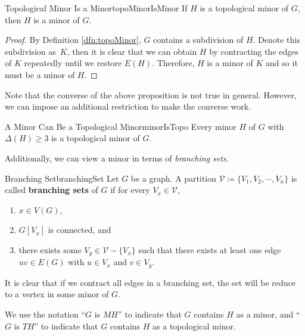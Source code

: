 \documentclass[math]{amznotes}
\theoremstyle{remark}
\newcommand{\0}{\mathbf{0}}
\newcommand{\1}{\mathbf{1}}
\begin{document}
\begin{probox}{Topological Minor Is a Minor}{topoMinorIsMinor}
    If $H$ is a topological minor of $G$, then $H$ is a minor of $G$.
    \tcblower
    \begin{proof}
        By Definition \ref{dfn:topoMinor}, $G$ contains a subdivision of $H$. Denote this subdivision as~$K$, then it is clear that we can obtain $H$ by contracting the edges of $K$ repeatedly until we restore $E(H)$. Therefore, $H$ is a minor of $K$ and so it must be a minor of $H$.
    \end{proof}
\end{probox}
Note that the converse of the above proposition is not true in general. However, we can impose an additional restriction to make the converse work.
\begin{probox}{A Minor Can Be a Topological Minor}{minorIsTopo}
    Every minor $H$ of $G$ with $\Delta(H) \geq 3$ is a topological minor of $G$.
\end{probox}
Additionally, we can view a minor in terms of \textit{branching sets}.
\begin{dfnbox}{Branching Set}{branchingSet}
    Let $G$ be a graph. A partition $\mathcal{V} \coloneqq \{V_1, V_2, \cdots, V_n\}$ is called {\color{red} \textbf{branching sets}} of $G$ if for every $V_x \in \mathcal{V}$,
    \begin{enumerate}
        \item $x \in V(G)$,
        \item $G[V_x]$ is connected, and
        \item there exists some $V_y \in \mathcal{V} - \{V_x\}$ such that there exists at least one edge $uv \in E(G)$ with $u \in V_x$ and $v \in V_y$.
    \end{enumerate}
\end{dfnbox}
It is clear that if we contract all edges in a branching set, the set will be reduce to a vertex in some minor of $G$. 

We use the notation ``$G$ is $MH$'' to indicate that $G$ contains $H$ as a minor, and ``$G$ is $TH$'' to indicate that $G$ contains $H$ as a topological minor.
\end{document}
